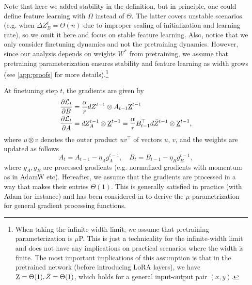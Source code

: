 Note that here we added stability in the definition, but in principle, one could define feature learning with $\Omega$ instead of $\Theta$. The latter covers unstable scenarios (e.g. when $\Delta Z_B^t = \Theta(n)$ due to improper scaling of initialization and learning rate), so we omit it here and focus on stable feature learning. Also, notice that we only consider finetuning dynamics and not the pretraining dynamics. However, since our analysis depends on weights $W^*$ from pretraining, we assume that pretraining parameterization ensures stability and feature learning as width grows (see \cref{app:proofs} for more details).\footnote{When taking the infinite width limit, we assume that pretraining parameterization is $\mu$P. This is just a technicality for the infinite-width limit and does not have any implications on practical scenarios where the width is finite. The most important implications of this assumption is that in the pretrained network (before introducing LoRA layers), we have $\underbar{Z} = \Theta(1), \Bar{Z} = \Theta(1)$, which holds for a general input-output pair $(x,y)$.}

At finetuning step $t$, the gradients are given by
\begin{align*}
\frac{\partial \mathcal{L}_t}{\partial B} &= \frac{\alpha}{r} d\Bar{Z}^{t-1} \otimes A_{t-1} \underbar{Z}^{t-1}\\
\frac{\partial \mathcal{L}_t}{\partial A} &= dZ_A^{t-1} \otimes \underbar{Z}^{t-1} = \frac{\alpha}{r} B^\top_{t-1} d\Bar{Z}^{t-1} \otimes \underbar{Z}^{t-1},
\end{align*}
where $u \otimes v$ denotes the outer product $uv^\top$ of vectors $u$, $v$,
and the weights are updated as follows
$$
A_{t} = A_{t-1} - \eta_A g_A^{t-1}, \quad B_{t} = B_{t-1} - \eta_B g_B^{t-1},
$$
where $g_A, g_B$ are processed gradients (e.g. normalized gradients with momentum as in AdamW etc). Hereafter, we assume that the gradients are processed in a way that makes their entries $\Theta(1)$. This is generally satisfied in practice (with Adam for instance) and has been considered in \cite{yang2023tensor} to derive the $\mu$-parametrization for general gradient processing functions. 

